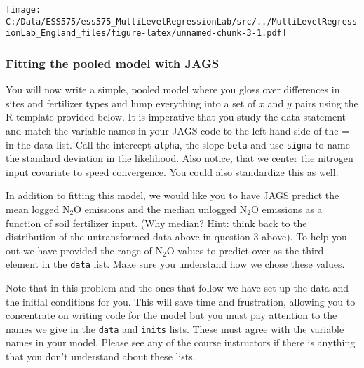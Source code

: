 \documentclass[
]{article}
\begin{document}
\texttt{[image: C:/Data/ESS575/ess575\_MultiLevelRegressionLab/src/../MultiLevelRegressionLab\_England\_files/figure-latex/unnamed-chunk-3-1.pdf]}

\hypertarget{fitting-the-pooled-model-with-jags}{%
\subsubsection{Fitting the pooled model with
JAGS}\label{fitting-the-pooled-model-with-jags}}

You will now write a simple, pooled model where you gloss over
differences in sites and fertilizer types and lump everything into a set
of \(x\) and \(y\) pairs using the R template provided below. It is
imperative that you study the data statement and match the variable
names in your JAGS code to the left hand side of the = in the data list.
Call the intercept \texttt{alpha}, the slope \texttt{beta} and use
\texttt{sigma} to name the standard deviation in the likelihood. Also
notice, that we center the nitrogen input covariate to speed
convergence. You could also standardize this as well.

In addition to fitting this model, we would like you to have JAGS
predict the mean logged \(\textrm{N} _2 \textrm{O}\) emissions and the
median unlogged \(\textrm{N} _2 \textrm{O}\) emissions as a function of
soil fertilizer input. (Why median? Hint: think back to the distribution
of the untransformed data above in question 3 above). To help you out we
have provided the range of \(\textrm{N} _2 \textrm{O}\) values to
predict over as the third element in the \texttt{data} list. Make sure
you understand how we chose these values.

Note that in this problem and the ones that follow we have set up the
data and the initial conditions for you. This will save time and
frustration, allowing you to concentrate on writing code for the model
but you must pay attention to the names we give in the \texttt{data} and
\texttt{inits} lists. These must agree with the variable names in your
model. Please see any of the course instructors if there is anything
that you don't understand about these lists.
\end{document}
